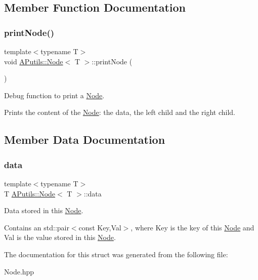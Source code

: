 \subsection{Member Function Documentation}
\mbox{\label{struct_a_putils_1_1_node_aed063f9c03ec7899e405062be5a0b702}} 
\subsubsection{\texorpdfstring{print\+Node()}{printNode()}}
{\footnotesize\ttfamily template$<$typename T$>$ \\
void \hyperlink{struct_a_putils_1_1_node}{A\+Putils\+::\+Node}$<$ T $>$\+::print\+Node (\begin{DoxyParamCaption}{ }\end{DoxyParamCaption})\hspace{0.3cm}{\ttfamily [inline]}}



Debug function to print a {\ttfamily \hyperlink{struct_a_putils_1_1_node}{Node}}. 

Prints the content of the {\ttfamily \hyperlink{struct_a_putils_1_1_node}{Node}}\+: the {\ttfamily data}, the {\ttfamily left} child and the {\ttfamily right} child. 

\subsection{Member Data Documentation}
\mbox{\label{struct_a_putils_1_1_node_aaeaf283a76b1095627efa92a98199600}} 
\subsubsection{\texorpdfstring{data}{data}}
{\footnotesize\ttfamily template$<$typename T$>$ \\
T \hyperlink{struct_a_putils_1_1_node}{A\+Putils\+::\+Node}$<$ T $>$\+::data}



Data stored in this {\ttfamily \hyperlink{struct_a_putils_1_1_node}{Node}}. 

Contains an std\+::pair$<$const Key,\+Val$>$, where Key is the key of this \hyperlink{struct_a_putils_1_1_node}{Node} and Val is the value stored in this \hyperlink{struct_a_putils_1_1_node}{Node}. 

The documentation for this struct was generated from the following file\+:\begin{DoxyCompactItemize}
\item 
Node.\+hpp\end{DoxyCompactItemize}
